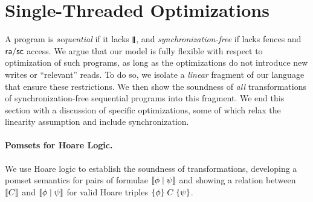 \section{Single-Threaded Optimizations}
\label{sec:opt}

A program is \emph{sequential} if it lacks $\!\!\,\mathbin{\texttt{\textbf{|}}\mkern-6mu\texttt{\textbf{|}}}\,\!\!$, and
\emph{synchronization-free} if lacks fences and ${\mathsf{ra}}/{\mathsf{sc}}$ access.
We argue that our model is fully flexible with respect to 
optimization of such programs, as long as the
optimizations do not introduce new writes or ``relevant'' reads.  To do so, we
 isolate a \emph{linear} fragment of our language that ensure these
restrictions.  We then show the soundness of {\em all} transformations of
synchronization-free sequential programs into this fragment.  
%
We end this section with a discussion of specific optimizations, some of
which relax the linearity assumption and include synchronization.

\paragraph{Pomsets for Hoare Logic.}
We use Hoare logic to establish the soundness of transformations, developing
a pomset semantics for pairs of formulae $\llbracket\phi\mid\psi\rrbracket$ and showing
a relation between $\llbracket C\rrbracket$ and $\llbracket\phi\mid\psi\rrbracket$ for valid Hoare
triples $\{\phi\}\allowbreak\;C\;\allowbreak\{\psi\}$.

